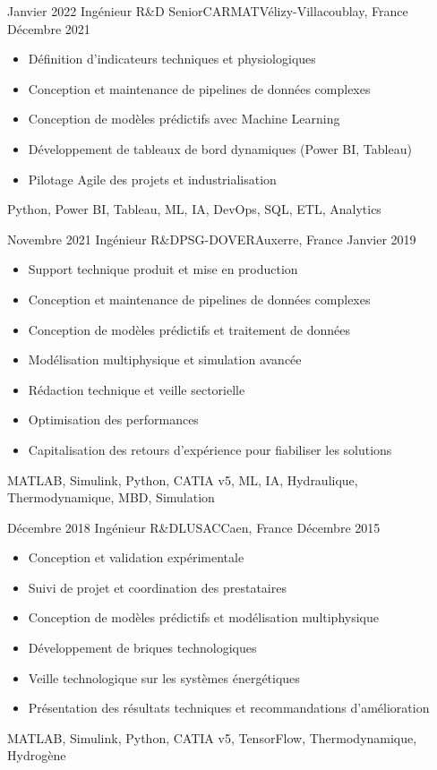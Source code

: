 \begin{experiences}
  \experience
    {Janvier 2022}   {Ingénieur R\&D Senior}{CARMAT}{Vélizy-Villacoublay, France}
    {Décembre 2021} {
      \begin{itemize}
        \item Définition d'indicateurs techniques et physiologiques
        \item Conception et maintenance de pipelines de données complexes
        \item Conception de modèles prédictifs avec Machine Learning
        \item Développement de tableaux de bord dynamiques (Power BI, Tableau)
        \item Pilotage Agile des projets et industrialisation
      \end{itemize}
    }
    {Python, Power BI, Tableau, ML, IA, DevOps, SQL, ETL, Analytics}
  \emptySeparator

  \experience
    {Novembre 2021}   {Ingénieur R\&D}{PSG-DOVER}{Auxerre, France}
    {Janvier 2019} {
      \begin{itemize}
        \item Support technique produit et mise en production
        \item Conception et maintenance de pipelines de données complexes
        \item Conception de modèles prédictifs et traitement de données
        \item Modélisation multiphysique et simulation avancée
        \item Rédaction technique et veille sectorielle
        \item Optimisation des performances
        \item Capitalisation des retours d'expérience pour fiabiliser les solutions
      \end{itemize}
    }
    {MATLAB, Simulink, Python, CATIA v5, ML, IA, Hydraulique, Thermodynamique, MBD, Simulation}
  \emptySeparator

  \experience
    {Décembre 2018}   {Ingénieur R\&D}{LUSAC}{Caen, France}
    {Décembre 2015} {
      \begin{itemize}
        \item Conception et validation expérimentale
        \item Suivi de projet et coordination des prestataires
        \item Conception de modèles prédictifs et modélisation multiphysique
        \item Développement de briques technologiques
        \item Veille technologique sur les systèmes énergétiques
        \item Présentation des résultats techniques et recommandations d'amélioration
      \end{itemize}
    }
    {MATLAB, Simulink, Python, CATIA v5, TensorFlow, Thermodynamique, Hydrogène}
  \emptySeparator


\end{experiences}
